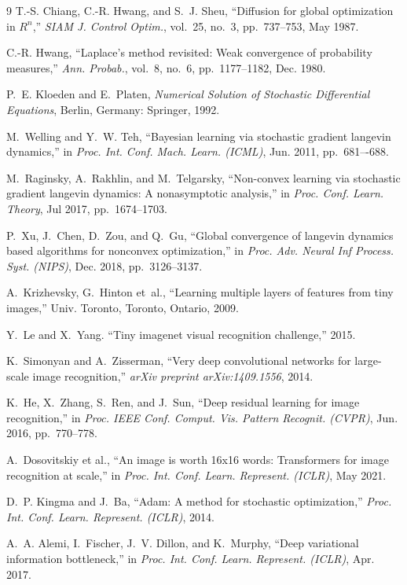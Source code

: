 \documentclass[lettersize,journal]{IEEEtran}
\theoremstyle{definition}
\theoremstyle{plain}
\begin{document}
\begin{thebibliography}{9}
T.-S. Chiang, C.-R. Hwang, and S.~J. Sheu, ``Diffusion for global optimization in $R^n$,'' \emph{SIAM J. Control Optim.}, vol.~25, no.~3, pp.~737--753, May 1987.

C.-R. Hwang, ``{Laplace's method revisited: Weak convergence of probability measures},'' \emph{Ann. Probab.}, vol.~8, no.~6, pp.~1177--1182, Dec. 1980.


P.~E. Kloeden and E.~Platen, \emph{Numerical Solution of Stochastic Differential Equations}, Berlin, Germany: Springer, 1992.

M.~Welling and Y.~W. Teh, ``Bayesian learning via stochastic gradient langevin dynamics,'' in \emph{Proc. Int. Conf. Mach. Learn. (ICML)}, Jun. 2011, pp.~681–-688.

M.~Raginsky, A.~Rakhlin, and M.~Telgarsky, ``Non-convex learning via stochastic gradient langevin dynamics: A nonasymptotic analysis,'' in \emph{Proc. Conf. Learn. Theory}, Jul 2017, pp.~1674--1703.

P.~Xu, J.~Chen, D.~Zou, and Q.~Gu, ``Global convergence of langevin dynamics based algorithms for nonconvex optimization,'' in \emph{Proc. Adv. Neural Inf Process. Syst. (NIPS)}, Dec. 2018, pp.~3126--3137.


A.~Krizhevsky, G.~Hinton et~al., ``Learning multiple layers of features from tiny images,'' Univ. Toronto, Toronto, Ontario, 2009.

Y.~Le and X.~Yang. ``Tiny imagenet visual recognition challenge,'' 2015.


K.~Simonyan and A.~Zisserman, ``Very deep convolutional networks for large-scale image recognition,'' \emph{arXiv preprint arXiv:1409.1556}, 2014.

K.~He, X.~Zhang, S.~Ren, and J.~Sun, ``Deep residual learning for image recognition,'' in \emph{Proc. IEEE Conf. Comput. Vis. Pattern Recognit. (CVPR)}, Jun. 2016, pp.~770--778.

A.~Dosovitskiy et al., “An image is worth 16x16 words: Transformers for
image recognition at scale,” in \emph{Proc. Int. Conf. Learn. Represent. (ICLR)}, May 2021.

D.~P. Kingma and J.~Ba, ``Adam: A method for stochastic optimization,'' \emph{Proc. Int. Conf. Learn. Represent. (ICLR)}, 2014.

A.~A. Alemi, I.~Fischer, J.~V. Dillon, and K.~Murphy, ``Deep variational information bottleneck,'' in \emph{Proc. Int. Conf. Learn. Represent. (ICLR)}, Apr. 2017.




\end{thebibliography}
\end{document}
